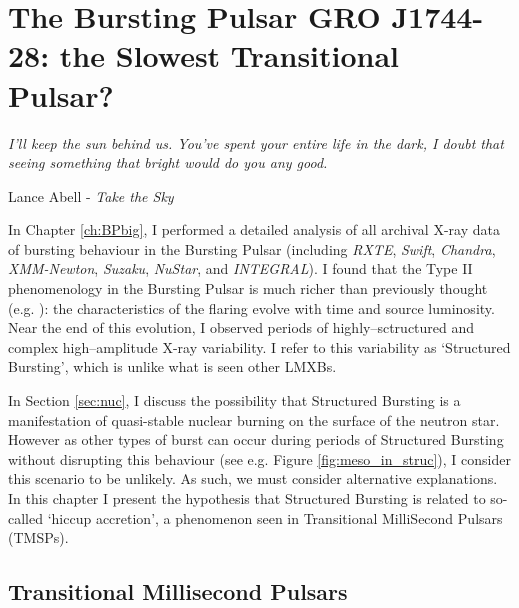 \chapter{The Bursting Pulsar GRO J1744-28: the Slowest Transitional Pulsar?}

\label{ch:BPletter}

\epigraph{\textit{I'll keep the sun behind us.  You've spent your entire life in the dark, I doubt that seeing something that bright would do you any good.}}{Lance Abell - \textit{Take the Sky}}
\vspace{1cm}

\par\noindent In Chapter \ref{ch:BPbig}, I performed a detailed analysis of all archival X-ray data of bursting behaviour in the Bursting Pulsar (including \textit{RXTE}, \textit{Swift}, \textit{Chandra}, \textit{XMM-Newton}, \textit{Suzaku}, \textit{NuStar}, and \textit{INTEGRAL}).  I found that the Type II phenomenology in the Bursting Pulsar is much richer than previously thought (e.g. \citealp{Giles_BP}): the characteristics of the flaring evolve with time and source luminosity. Near the end of this evolution, I observed periods of highly--sctructured and complex high--amplitude X-ray variability.  I refer to this variability as `Structured Bursting', which is unlike what is seen other LMXBs.
\par In Section \ref{sec:nuc}, I discuss the possibility that Structured Bursting is a manifestation of quasi-stable nuclear burning on the surface of the neutron star.  However as other types of burst can occur during periods of Structured Bursting without disrupting this behaviour (see e.g. Figure \ref{fig:meso_in_struc}), I consider this scenario to be unlikely.  As such, we must consider alternative explanations.  In this chapter I present the hypothesis that Structured Bursting is related to so-called `hiccup accretion', a phenomenon seen in Transitional MilliSecond Pulsars (TMSPs).

\section{Transitional Millisecond Pulsars}

